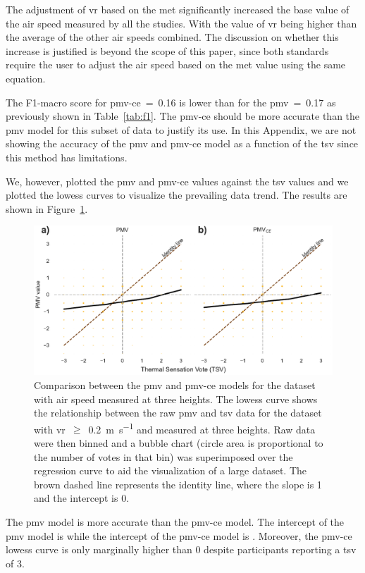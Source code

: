 The adjustment of \ac{vr} based on the \ac{met} significantly increased the base value of the air speed measured by all the studies.
With the value of \ac{vr} being  higher than the average of the other air speeds combined.
The discussion on whether this increase is justified is beyond the scope of this paper, since both standards require the user to adjust the air speed based on the \ac{met} value using the same equation.

The F1-macro score for \ac{pmv-ce}~=~\num{.16} is lower than for the \ac{pmv}~=~\num{.17} as previously shown in Table~\ref{tab:f1}.
The \ac{pmv-ce} should be more accurate than the \ac{pmv} model for this subset of data to justify its use.
In this Appendix, we are not showing the accuracy of the \ac{pmv} and \ac{pmv-ce} model as a function of the \ac{tsv} since this method has limitations.

We, however, plotted the \ac{pmv} and \ac{pmv-ce} values against the \ac{tsv} values and we plotted the \ac{lowess} curves to visualize the prevailing data trend.
The results are shown in Figure~\ref{fig:bubble_models_vs_tsv_three_heights}.
\begin{figure}[htb!]
    \centering
    \includegraphics[width=\textwidth]{figures/bubble_models_vs_tsv_three_heights}
    \caption{Comparison between the \ac{pmv} and \ac{pmv-ce} models for the dataset with air speed measured at three heights. 
    The \ac{lowess} curve shows the relationship between the raw \ac{pmv} and \ac{tsv} data for the dataset with \ac{vr}~$\geq$~\qty{0.2}{\m\per\s} and measured at three heights.
    Raw data were then binned and a bubble chart (circle area is proportional to the number of votes in that bin) was superimposed over the regression curve to aid the visualization of a large dataset.
    The brown dashed line represents the identity line, where the slope is 1 and the intercept is 0.}
    \label{fig:bubble_models_vs_tsv_three_heights}
\end{figure}
The \ac{pmv} model is more accurate than the \ac{pmv-ce} model.
The intercept of the \ac{pmv} model is  while the intercept of the \ac{pmv-ce} model is .
Moreover, the \ac{pmv-ce} \ac{lowess} curve is only marginally higher than \num{0} despite participants reporting a \ac{tsv} of \num{3}.

